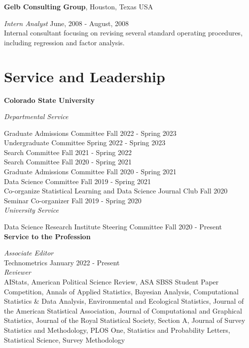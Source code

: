 \documentclass[margin,line]{res}
\begin{document}
\begin{resume}
{\bf Gelb Consulting Group}, Houston, Texas USA

\vspace{-.3cm}
{\em Intern Analyst} \hfill {June, 2008 - August, 2008}\\
Internal consultant focusing on revising several standard operating procedures, including regression and factor analysis. 

\section{\sc Service and Leadership}

{\bf Colorado State University}

\vspace{-.3cm}
{\em Departmental Service}

\vspace{-.3cm}
Graduate Admissions Committee \hfill {Fall 2022 - Spring 2023} \\
Undergraduate Committee \hfill {Spring 2022 - Spring 2023} \\
Search Committee \hfill {Fall 2021 - Spring 2022} \\
Search Committee \hfill {Fall 2020 - Spring 2021} \\
Graduate Admissions Committee \hfill {Fall 2020 - Spring 2021} \\
Data Science Committee \hfill {Fall 2019 - Spring 2021} \\
Co-organize Statistical Learning and Data Science Journal Club \hfill {Fall 2020} \\
Seminar Co-organizer \hfill {Fall 2019 - Spring 2020} \\

\vspace{-.3cm}
{\em University Service}

\vspace{-.3cm}
Data Science Research Institute Steering Committee \hfill {Fall 2020 - Present} \\

{\bf Service to the Profession}

\vspace{-.3cm}
{\em Associate Editor}  \\
\vspace{-.3cm}
Technometrics \hfill {January 2022 - Present} \\


{\em Reviewer} \\
AIStats, American Political Science Review, ASA SBSS Student Paper Competition, Annals of Applied Statistics, Bayesian Analysis, Computational Statistics \& Data Analysis, Environmental and Ecological Statistics, Journal of the American Statistical Association, Journal of Computational and Graphical Statistics, Journal of the Royal Statistical Society, Section A, Journal of Survey Statistics and Methodology, PLOS One, Statistics and Probability Letters, Statistical Science,  Survey Methodology \\


\end{resume}
\end{document}
